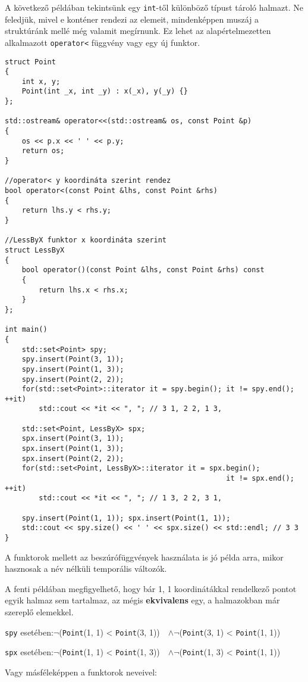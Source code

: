 \documentclass[a4paper,11.5pt,table]{article}
\begin{document}
	\medskip
	A következő példában tekintsünk egy \texttt{int}-től különböző típust tároló halmazt. Ne feledjük, mivel e konténer rendezi az elemeit, mindenképpen muszáj a struktúránk mellé még valamit megírnunk. Ez lehet az alapértelmezetten alkalmazott \texttt{operator<} függvény vagy egy új funktor.
\begin{lstlisting}
struct Point
{
	int x, y;
	Point(int _x, int _y) : x(_x), y(_y) {}
};

std::ostream& operator<<(std::ostream& os, const Point &p)
{
	os << p.x << ' ' << p.y;
	return os;
}

//operator< y koordináta szerint rendez
bool operator<(const Point &lhs, const Point &rhs)
{
	return lhs.y < rhs.y;
}

//LessByX funktor x koordináta szerint
struct LessByX
{
	bool operator()(const Point &lhs, const Point &rhs) const
	{
		return lhs.x < rhs.x;
	}
};

int main()
{	
	std::set<Point> spy;
	spy.insert(Point(3, 1));
	spy.insert(Point(1, 3));
	spy.insert(Point(2, 2));
	for(std::set<Point>::iterator it = spy.begin(); it != spy.end(); ++it)
		std::cout << *it << ", "; // 3 1, 2 2, 1 3,
	
	std::set<Point, LessByX> spx;
	spx.insert(Point(3, 1));
	spx.insert(Point(1, 3));
	spx.insert(Point(2, 2));
	for(std::set<Point, LessByX>::iterator it = spx.begin(); 
												    it != spx.end(); ++it)
		std::cout << *it << ", "; // 1 3, 2 2, 3 1,
	
	spy.insert(Point(1, 1)); spx.insert(Point(1, 1));
	std::cout << spy.size() << ' ' << spx.size() << std::endl; // 3 3
}
\end{lstlisting}
	\begin{note}
		A funktorok mellett az beszúrófüggvények használata is jó példa arra, mikor hasznosak a név nélküli temporális változók.
	\end{note}
	A fenti példában megfigyelhető, hogy bár 1, 1 koordinátákkal rendelkező pontot egyik halmaz sem tartalmaz, az mégis \textbf{ekvivalens} egy, a halmazokban már szereplő elemekkel.
	
	\begin{center}	
		\texttt{spy} esetében:\quad  $\neg$\big(\texttt{Point}(1, 1) < \texttt{Point}(3, 1)\big) \,\, $\wedge$\quad $\neg$\big(\texttt{Point}(3, 1) < \texttt{Point}(1, 1)\big)
		
		\texttt{spx} esetében:\quad  $\neg$\big(\texttt{Point}(1, 1) < \texttt{Point}(1, 3)\big) \,\, $\wedge$\quad $\neg$\big(\texttt{Point}(1, 3) < \texttt{Point}(1, 1)\big)
	\end{center}
	Vagy másféleképpen a funktorok neveivel:
	
\end{document}

